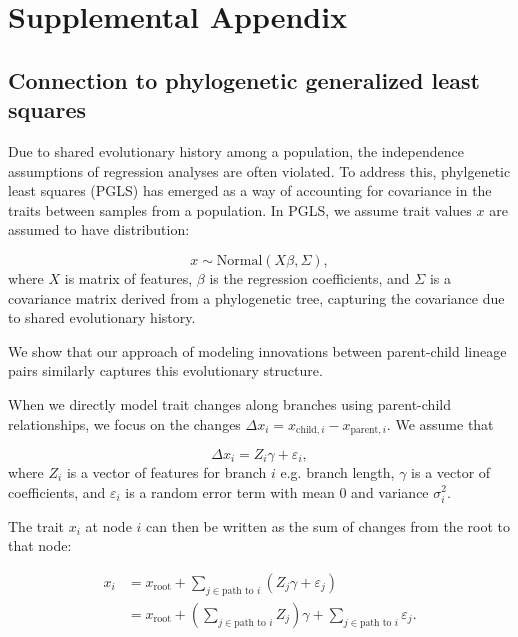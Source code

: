 \documentclass[12pt,oneside,letterpaper]{article}
\begin{document}
\section*{Supplemental Appendix}

\subsection*{Connection to phylogenetic generalized least squares}


Due to shared evolutionary history among a population, the independence assumptions of regression analyses are often violated.
To address this, phylgenetic least squares (PGLS) has emerged as a way of accounting for covariance in the traits between samples from a population.
In PGLS, we assume trait values $x$ are assumed to have distribution:

\begin{equation*}
x \sim \text{Normal}(X \beta,\Sigma),
\end{equation*}
where $X$ is matrix of features, $\beta$ is the regression coefficients, and $\Sigma$ is a covariance matrix derived from a phylogenetic tree, capturing the covariance due to shared evolutionary history.

We show that our approach of modeling innovations between parent-child lineage pairs similarly captures this evolutionary structure.

When we directly model trait changes along branches using parent-child relationships, we focus on the changes $\Delta x_i = x_{\text{child}, i} - x_{\text{parent}, i}$. We assume that

\begin{equation}
\Delta x_i = Z_i \gamma + \varepsilon_i,
\end{equation}
where $Z_i$ is a vector of features for branch $i$ e.g. branch length, $\gamma$ is a vector of coefficients, and $\varepsilon_i$ is a random error term with mean 0 and variance $\sigma_i^2$.

The trait $x_i$ at node $i$ can then be written as the sum of changes from the root to that node:

\begin{align*}
    x_i &= x_{\text{root}} + \sum_{j \in \text{path to } i} (Z_j \gamma + \varepsilon_j)\\
	&= x_{\text{root}} + \left( \sum_{j \in \text{path to } i} Z_j \right) \gamma + \sum_{j \in \text{path to } i} \varepsilon_j.
\end{align*}
\end{document}
